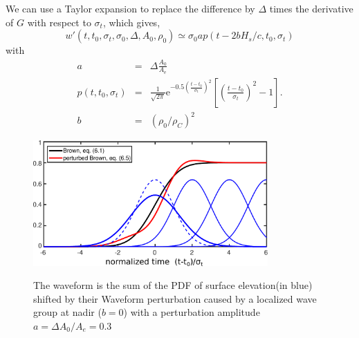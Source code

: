 We can use a Taylor expansion to replace the difference by $\Delta$ times the derivative of $G$ with respect to $\sigma_t$, which gives, 
\begin{equation}
   w'(t,t_0,\sigma_t,\sigma_0,\Delta, A_0,\rho_0) \simeq   \sigma_0 a p(t-2 b H_s/c,t_0,\sigma_t)
\end{equation} 
with 
\begin{eqnarray}
        a&=&\Delta \frac{A_0}{A_{\mathrm{e}}} \label{eq:alti_a} \\ 
    p(t,t_0,\sigma_t) &=& \frac{1}{\sqrt{2\pi}} \mathrm{e}^{-0.5 \left(\frac{t-t_0}{\sigma_t} \right)^2 } \left[\left(\frac{t-t_0}{\sigma_t} \right)^2-1\right]. \label{eq:p_alti} \\
        b&=& \left(\rho_0/\rho_C \right)^2
\end{eqnarray} 

\begin{figure}[htb]
\centerline{\includegraphics[width=0.8\textwidth]{FIGS_CH_SAT/waveforms_perturbation.pdf}}
  \caption{The waveform is the sum of the PDF of surface elevation(in blue) shifted by their Waveform perturbation caused by a localized wave group at nadir ($b=0$) with a perturbation amplitude $a=\Delta A_0/A_e=0.3$}{} \label{fig:group_alti_perturb}
\end{figure}

